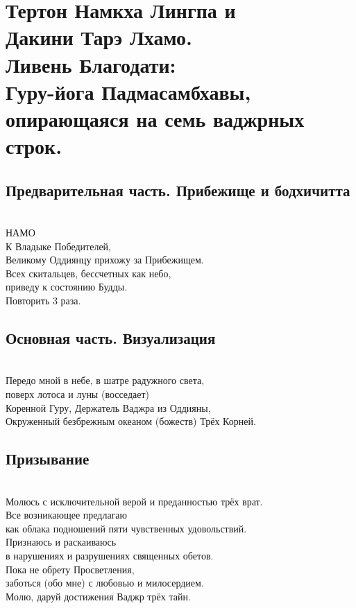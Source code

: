 \section{Тертон Намкха Лингпа и \\ Дакини Тарэ Лхамо.
 \\Ливень Благодати:\\Гуру-йога Падмасамбхавы, \\опирающаяся на семь ваджрных строк.}

\subsection{Предварительная часть. Прибежище и бодхичитта}
\\
НАМО\\
К Владыке Победителей, \\
\indent Великому Оддиянцу прихожу за Прибежищем.\\
Всех скитальцев, бессчетных как небо, \\
\indent приведу к состоянию Будды.\\
\scriptsize
Повторить 3 раза.
\normalsize \\

\subsection{Основная часть. Визуализация}
\\
Передо мной в небе, в шатре радужного света, \\ \indent поверх лотоса и луны (восседает)\\
Коренной Гуру, Держатель Ваджра из Оддияны,\\
Окруженный безбрежным океаном (божеств) Трёх Корней.\\

\subsection*{Призывание}
\\
Молюсь с исключительной верой и преданностью трёх врат.\\
Все возникающее предлагаю \\ \indent как облака подношений пяти чувственных удовольствий.\\
Признаюсь и раскаиваюсь \\ \indent в нарушениях и разрушениях священных обетов.\\
Пока не обрету Просветления, \\ \indent заботься (обо мне) с любовью и милосердием.\\
Молю, даруй достижения Ваджр трёх тайн.\\

